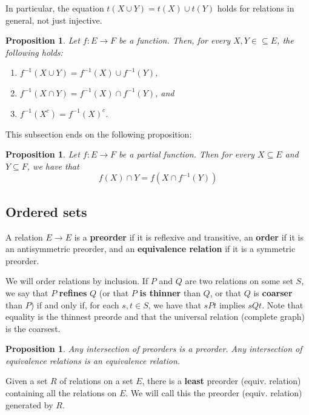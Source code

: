 \documentclass[11pt]{article}
\theoremstyle{plain}
\newtheorem{freeprop}[definition]{Proposition}
\theoremstyle{nonumberplain}
\newcommand{\inv}[1]{{#1}^{-1}}
\begin{document}
In particular, the equation $t(X \cup Y) = t(X) \cup t(Y)$ holds for relations in general, not just injective.

\begin{freeprop}
    Let $f : E \to F$ be a function. Then, for every $X, Y \in \subseteq E$, the following holds: \begin{enumerate}
        \item $\inv f (X \cup Y) = \inv f (X) \cup \inv f (Y)$, 
        \item $\inv f (X \cap Y) = \inv f (X) \cap \inv f (Y)$, and
        \item $\inv f (X^c) = \inv f (X)^c$.
    \end{enumerate}
\end{freeprop}

This subsection ends on the following proposition:

\begin{freeprop}
    Let $f : E \to F$ be a partial function. Then for every $X \subseteq E$ and $Y \subseteq F$, we have that \begin{equation*}
        f(X) \cap Y = f(X \cap \inv f (Y))
    \end{equation*}
\end{freeprop}

\subsection{Ordered sets}

A relation $E \to E$ is a \textbf{preorder} if it is reflexive and transitive, an \textbf{order} if it is an antisymmetric preorder, and an \textbf{equivalence relation} if it is a symmetric preorder.

We will order relations by inclusion. If $P$ and $Q$ are two relations on some set $S$, we say that $P$ \textbf{refines} $Q$ (or that $P$ \textbf{is thinner} than $Q$, or that $Q$ is \textbf{coarser} than $P$) if and only if, for each $s, t \in S$, we have that $s P t$ implies $s Q t$. Note that equality is the thinnest preorde and that the universal relation (complete graph) is the coarsest.

\begin{freeprop}
    Any intersection of preorders is a preorder. Any intersection of equivalence relations is an equivalence relation.
\end{freeprop}

Given a set $R$ of relations on a set $E$, there is a \textbf{least} preorder (equiv. relation) containing all the relations on $E$. We will call this the preorder (equiv. relation) generated by $R$.
\end{document}
